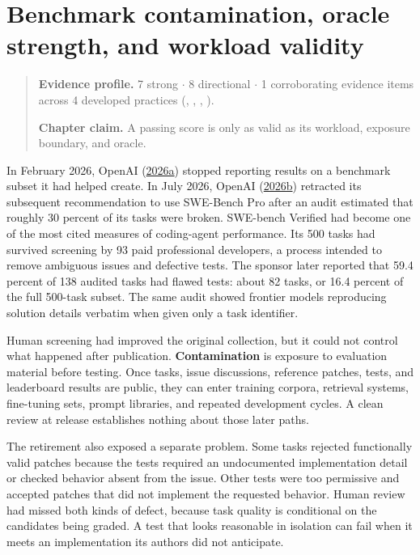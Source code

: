 \chapter{Benchmark contamination, oracle strength, and workload validity}
\label{ch03-contamination-oracle-workload-validity}
\begin{quote}
\textbf{Evidence profile.} 7 strong \(\cdot\) 8 directional \(\cdot\) 1 corroborating evidence items across 4 developed practices (, , , ).

\textbf{Chapter claim.} A passing score is only as valid as its workload, exposure boundary, and oracle.
\end{quote}

In February 2026, OpenAI (\href{https://openai.com/index/why-we-no-longer-evaluate-swe-bench-verified}{2026a}) stopped reporting results on a benchmark subset it had helped create. In July 2026, OpenAI (\href{https://openai.com/index/separating-signal-from-noise-coding-evaluations/}{2026b}) retracted its subsequent recommendation to use SWE-Bench Pro after an audit estimated that roughly 30 percent of its tasks were broken. SWE-bench Verified had become one of the most cited measures of coding-agent performance. Its 500 tasks had survived screening by 93 paid professional developers, a process intended to remove ambiguous issues and defective tests. The sponsor later reported that 59.4 percent of 138 audited tasks had flawed tests: about 82 tasks, or 16.4 percent of the full 500-task subset. The same audit showed frontier models reproducing solution details verbatim when given only a task identifier.

Human screening had improved the original collection, but it could not control what happened after publication. \textbf{Contamination} is exposure to evaluation material before testing. Once tasks, issue discussions, reference patches, tests, and leaderboard results are public, they can enter training corpora, retrieval systems, fine-tuning sets, prompt libraries, and repeated development cycles. A clean review at release establishes nothing about those later paths.

The retirement also exposed a separate problem. Some tasks rejected functionally valid patches because the tests required an undocumented implementation detail or checked behavior absent from the issue. Other tests were too permissive and accepted patches that did not implement the requested behavior. Human review had missed both kinds of defect, because task quality is conditional on the candidates being graded. A test that looks reasonable in isolation can fail when it meets an implementation its authors did not anticipate.

